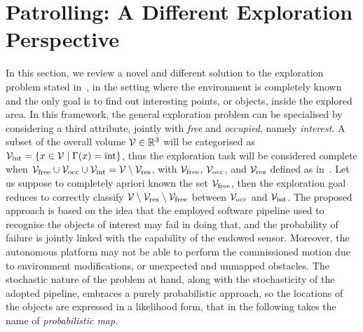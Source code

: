 \section{Patrolling: A Different Exploration Perspective}%
\label{SEC:SEARCH-PATROLLING-PERSPECTIVE}
In this section, we review a novel and different solution to the exploration problem stated in~,
in the setting where the environment is completely known and the only goal is to find out interesting points, or objects,
inside the explored area. In this framework, the general exploration problem can be specialised by considering a third attribute, jointly
with \emph{free} and \emph{occupied}, namely \emph{interest}. A subset of the overall volume $\mathcal{V} \in \mathbb{R}^3$ will be categorised as
$\mathcal{V}_{\text{int}} = \{ x \in \mathcal{V} \mid \Gamma(x) = \text{int} \}$, thus the exploration task will be considered complete when
$\mathcal{V}_{\text{free}} \cup \mathcal{V}_{\text{occ}} \cup \mathcal{V}_{\text{int}} = \mathcal{V} \setminus \mathcal{V}_{\text{res}}$, with $\mathcal{V}_{\text{free}}$, $\mathcal{V}_{\text{occ}}$,
and $\mathcal{V}_{\text{res}}$ defined as in~.
Let us suppose to completely apriori known the set $\mathcal{V}_{\text{free}}$, then the exploration goal reduces to correctly classify
$\mathcal{V} \setminus \mathcal{V}_{\text{res}} \setminus \mathcal{V}_{\text{free}}$ between $\mathcal{V}_{\text{occ}}$ and $\mathcal{V}_{\text{int}}$.
The proposed approach is based on the idea that the employed software pipeline used to recognise the objects of interest may fail
in doing that, and the probability of failure is jointly linked with the capability of the endowed sensor. Moreover, the autonomous
platform may not be able to perform the commissioned motion due to environment modifications, or unexpected and unmapped obstacles.
The stochastic nature of the problem at hand, along with the stochasticity of the adopted pipeline, embraces a purely probabilistic
approach, so the locations of the objects are expressed in a likelihood form, that in the following takes the name of
\emph{probabilistic map}.

